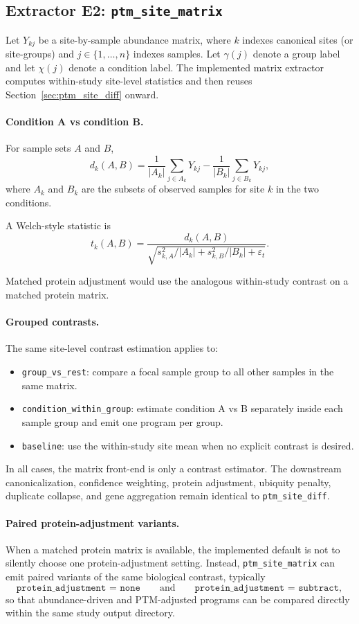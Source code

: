 \documentclass[11pt]{article}
\begin{document}
\subsection{Extractor E2: \texttt{ptm\_site\_matrix}}
\label{sec:ptm_site_matrix}

Let $Y_{kj}$ be a site-by-sample abundance matrix, where $k$ indexes canonical
sites (or site-groups) and $j \in \{1,\ldots,n\}$ indexes samples. Let
$\gamma(j)$ denote a group label and let $\chi(j)$ denote a condition label.
The implemented matrix extractor computes within-study site-level statistics and
then reuses Section~\ref{sec:ptm_site_diff} onward.

\paragraph{Condition A vs condition B.}
For sample sets $A$ and $B$,
\[
d_k(A,B) =
\frac{1}{|A_k|}\sum_{j \in A_k} Y_{kj}
-
\frac{1}{|B_k|}\sum_{j \in B_k} Y_{kj},
\]
where $A_k$ and $B_k$ are the subsets of observed samples for site $k$ in the
two conditions.

A Welch-style statistic is
\[
t_k(A,B) =
\frac{d_k(A,B)}
{\sqrt{s_{k,A}^2/|A_k| + s_{k,B}^2/|B_k| + \varepsilon_t}}.
\]

Matched protein adjustment would use the analogous within-study contrast on a
matched protein matrix.

\paragraph{Grouped contrasts.}
The same site-level contrast estimation applies to:
\begin{itemize}
\item \texttt{group\_vs\_rest}: compare a focal sample group to all other
samples in the same matrix.
\item \texttt{condition\_within\_group}: estimate condition A vs B separately
inside each sample group and emit one program per group.
\item \texttt{baseline}: use the within-study site mean when no explicit
contrast is desired.
\end{itemize}

In all cases, the matrix front-end is only a contrast estimator. The
downstream canonicalization, confidence weighting, protein adjustment, ubiquity
penalty, duplicate collapse, and gene aggregation remain identical to
\texttt{ptm\_site\_diff}.

\paragraph{Paired protein-adjustment variants.}
When a matched protein matrix is available, the implemented default is not to
silently choose one protein-adjustment setting. Instead,
\texttt{ptm\_site\_matrix} can emit paired variants of the same biological
contrast, typically
\[
\texttt{protein\_adjustment = none}
\qquad\text{and}\qquad
\texttt{protein\_adjustment = subtract},
\]
so that abundance-driven and PTM-adjusted programs can be compared directly
within the same study output directory.
\end{document}
